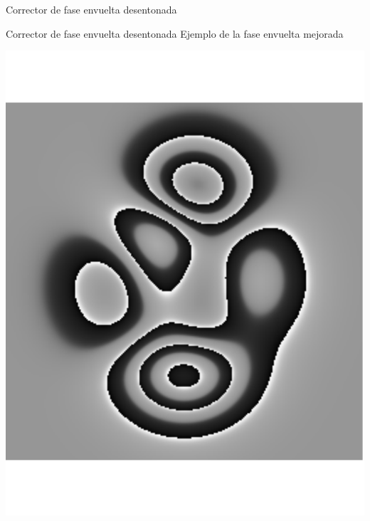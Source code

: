 \documentclass[]{beamer}
\begin{document}
\begin{frame}{Corrector de fase envuelta desentonada}
\begin{center}
\end{center}
\end{frame}
\begin{frame}{Corrector de fase envuelta desentonada}
Ejemplo de la fase envuelta mejorada
\begin{center}

\includegraphics[scale=0.2]{Images/wfaseIdeal_error.pdf} \quad

\end{center}
\end{frame}
\end{document}
